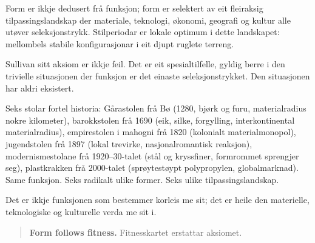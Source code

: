 \documentclass[10pt, a4paper, twocolumn]{article}
\begin{document}
Form er ikkje dedusert frå funksjon; form er selektert av eit fleiraksig tilpassingslandskap der materiale, teknologi, økonomi, geografi og kultur alle utøver seleksjonstrykk. Stilperiodar er lokale optimum i dette landskapet: mellombels stabile konfigurasjonar i eit djupt ruglete terreng.

Sullivan sitt aksiom er ikkje feil. Det er eit spesialtilfelle, gyldig berre i den trivielle situasjonen der funksjon er det einaste seleksjonstrykket. Den situasjonen har aldri eksistert.

Seks stolar fortel historia: Gårastolen frå Bø (1280, bjørk og furu, materialradius nokre kilometer), barokkstolen frå 1690 (eik, silke, forgylling, interkontinental materialradius), empirestolen i mahogni frå 1820 (kolonialt materialmonopol), jugendstolen frå 1897 (lokal trevirke, nasjonalromantisk reaksjon), modernismestolane frå 1920--30-talet (stål og kryssfiner, formrommet sprengjer seg), plastkrakken frå 2000-talet (sprøytestøypt polypropylen, globalmarknad). Same funksjon. Seks radikalt ulike former. Seks ulike tilpassingslandskap.

Det er ikkje funksjonen som bestemmer korleis me sit; det er heile den materielle, teknologiske og kulturelle verda me sit i.

\begin{quote}
\textbf{Form follows fitness.} Fitnesskartet erstattar aksiomet.
\end{quote}


\newpage
\onecolumn


\end{document}
